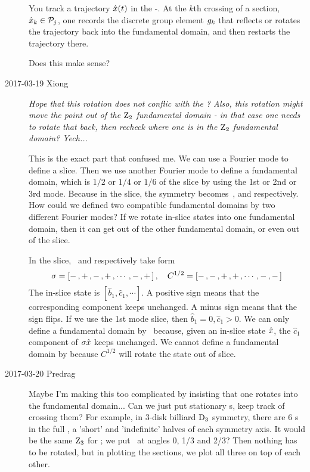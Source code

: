 \begin{description}
You track a trajectory $\hat{x}(t)$ in the -{\reducedsp}. At
the $k$th crossing of a section, $\hat{x}_k\in\mathcal{P}_j$, one records the
discrete group element ${g}_k$ that reflects or rotates the
trajectory back into the fundamental domain, and then restarts the
trajectory there.

Does this make sense?

\item[2017-03-19 Xiong]

  \emph{
    Hope that this rotation does not conflic with the \fFslice?
    Also, this rotation might move the point out of the $\textrm{Z}_{2}$
    fundamental domain - in that case one needs to rotate that back, then
    recheck where one is in the $\textrm{Z}_{2}$ fundamental domain? Yech...
  }


  This is the exact part that confused me.
  We can use a Fourier mode to define a slice. Then we use another
  Fourier mode to define a fundamental domain, which is $1/2$ or
  $1/4$ or $1/6$  of the slice by using the 1st or 2nd or 3rd mode.
  Because in the slice, the symmetry becomes \Refl\,,  and
   respectively.
  How could we defined  two compatible fundamental domains by
  two different Fourier modes? If we rotate in-slice states into
  one fundamental domain, then it can get out of the other fundamental
  domain, or even out of the slice.

  In the slice, \Refl\ and  respectively
  take form
  \[
    \sigma = [-\,, +\,,-\,, +\,,\cdots, -\,, +\,] \,,\quad
    C^{1/2} = [-\,, -\,,+\,, +\,,\cdots, -\,, -\,]
  \]
  The in-slice state is $[\hat{b}_1, \hat{c}_1, \cdots]$.
  A positive sign means that the corresponding component keeps unchanged.
  A minus sign means that the sign flips.
  If we use the 1st mode slice, then $\hat{b}_1 = 0, \hat{c}_1 > 0$.
  We can only
  define a fundamental domain by \Refl\ because,
  given an in-slice state $\hat{x}$,
  the $\hat{c}_1$ component of $\sigma \hat{x}$ keeps unchanged.
  We cannot define a
  fundamental domain by
   because $C^{1/2}$ will rotate the state out of slice.

\item[2017-03-20 Predrag]
Maybe I'm making this too complicated by insisting that one rotates into
the fundamental domain... Can we just put stationary \PoincSec s, keep
track of crossing them? For example, in 3-disk billiard $\textrm{D}_{3}$
symmetry, there are 6 \PoincSec s in the full \statesp, a 'short' and
'indefinite' halves of each symmetry axis. It would be the same $\textrm{Z}_{3}$
for \KS; we put \PoincSec\ at angles 0, 1/3 and 2/3? Then nothing has to
be rotated, but in plotting the sections, we plot all three on top of
each other.


\end{description}
